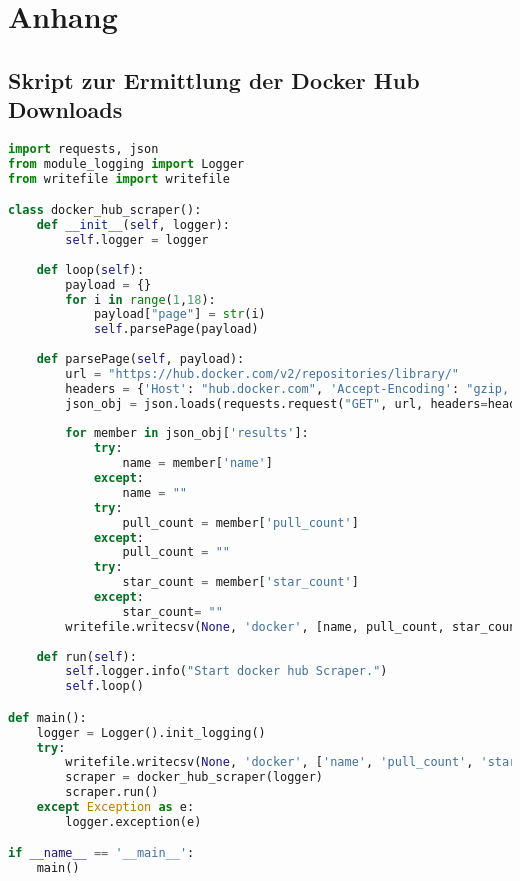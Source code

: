 \chapter{Anhang}

\section{Skript zur Ermittlung der Docker Hub Downloads}

\begin{lstlisting}[language=Python,frame=tb,caption=Skript zur Ermittlung der Docker Hub Downloads,captionpos=b,label=lst:dockerhubscript]
import requests, json
from module_logging import Logger
from writefile import writefile

class docker_hub_scraper():
	def __init__(self, logger):
		self.logger = logger
		
	def loop(self):
		payload = {}
		for i in range(1,18):
			payload["page"] = str(i)
			self.parsePage(payload)
		
	def parsePage(self, payload):
		url = "https://hub.docker.com/v2/repositories/library/"
		headers = {'Host': "hub.docker.com", 'Accept-Encoding': "gzip, deflate"}
		json_obj = json.loads(requests.request("GET", url, headers=headers, params=payload).text)
		
		for member in json_obj['results']:
			try:
				name = member['name']
			except:
				name = ""
			try:
				pull_count = member['pull_count']
			except:
				pull_count = ""
			try: 
				star_count = member['star_count']
			except:
				star_count= ""
		writefile.writecsv(None, 'docker', [name, pull_count, star_count])
	
	def run(self):
		self.logger.info("Start docker hub Scraper.")
		self.loop()

def main():
	logger = Logger().init_logging()
	try:
		writefile.writecsv(None, 'docker', ['name', 'pull_count', 'star_count'])
		scraper = docker_hub_scraper(logger)
		scraper.run()
	except Exception as e:
		logger.exception(e)

if __name__ == '__main__':
	main()
\end{lstlisting}
\newpage

